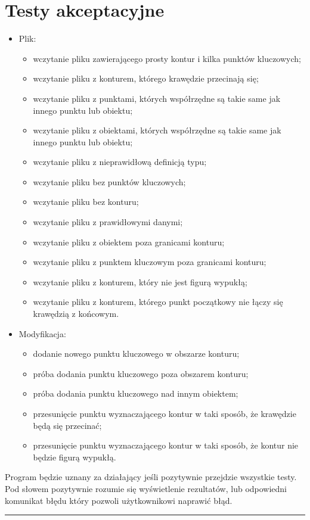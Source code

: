 \documentclass[a4paper,11pt]{article}
\newcommand{\linia}{\rule{\linewidth}{0.4mm}}
\begin{document}
\section{Testy akceptacyjne}
\begin{itemize}
\item Plik:
\begin{itemize}
\item wczytanie pliku zawierającego prosty kontur i kilka punktów kluczowych;
\item wczytanie pliku z konturem, którego krawędzie przecinają się;
\item wczytanie pliku z punktami, których współrzędne są takie same jak innego punktu lub obiektu;
\item wczytanie pliku z obiektami, których współrzędne są takie same jak innego punktu lub obiektu;
\item wczytanie pliku z nieprawidłową definicją typu;
\item wczytanie pliku bez punktów kluczowych;
\item wczytanie pliku bez konturu;
\item wczytanie pliku z prawidłowymi danymi;
\item wczytanie pliku z obiektem poza granicami konturu;
\item wczytanie pliku z punktem kluczowym poza granicami konturu;
\item wczytanie pliku z konturem, który nie jest figurą wypukłą;
\item wczytanie pliku z konturem, którego punkt początkowy nie łączy się krawędzią z końcowym.
\end{itemize}
\item Modyfikacja:
\begin{itemize}
\item dodanie nowego punktu kluczowego w obszarze konturu;
\item próba dodania punktu kluczowego poza obszarem konturu;
\item próba dodania punktu kluczowego nad innym obiektem;
\item przesunięcie punktu wyznaczającego kontur w taki sposób, że krawędzie będą się przecinać;
\item przesunięcie punktu wyznaczającego kontur w taki sposób, że kontur nie będzie figurą wypukłą.
\end{itemize}

\end{itemize}
Program będzie uznany za działający jeśli pozytywnie przejdzie wszystkie testy. Pod słowem pozytywnie rozumie się wyświetlenie rezultatów, lub odpowiedni komunikat błędu który pozwoli użytkownikowi naprawić błąd.
\noindent\linia
\end{document}
